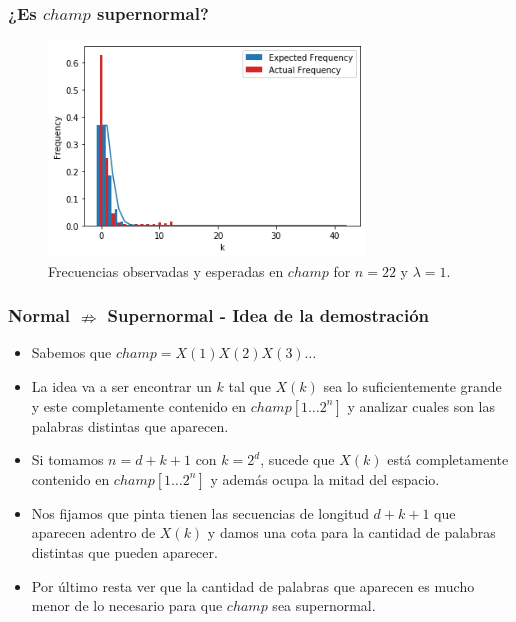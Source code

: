 \documentclass[10pt,mathserif]{beamer}%
\begin{document}
\begin{frame}
  \frametitle{¿Es $champ$ supernormal?}
  \begin{figure}[h]
    \includegraphics[width=0.75\textwidth]{imagenes/champ-22-freq.png}
    \centering
    \caption{Frecuencias observadas y esperadas en $champ$ for $n = 22$ y $\lambda = 1$.}
    \label{fig:champ-22-freq}
\end{figure}
\end{frame}

\begin{frame}
  \frametitle{Normal $\nRightarrow$ Supernormal - Idea de la demostración}
  \begin{itemize}
    \item Sabemos que $champ = X(1)X(2)X(3)\dots$
    \pause 
    \item La idea va a ser encontrar un $k$ tal que $X(k)$ sea lo suficientemente grande y este completamente contenido en $champ[1\dots 2^n]$ y analizar cuales son las palabras distintas que aparecen.
    \pause 
    \item Si tomamos $n = d + k + 1$ con $k = 2^d$, sucede que $X(k)$ está completamente contenido en $champ[1\dots 2^n]$ y además ocupa la mitad del espacio.
    \pause 
    \item Nos fijamos que pinta tienen las secuencias de longitud $d + k + 1$ que aparecen adentro de $X(k)$ y damos una cota para la cantidad de palabras distintas que pueden aparecer.
    \pause
    \item Por último resta ver que la cantidad de palabras que aparecen es mucho menor de lo necesario para que $champ$ sea supernormal.
  \end{itemize}
\end{frame}
\end{document}
